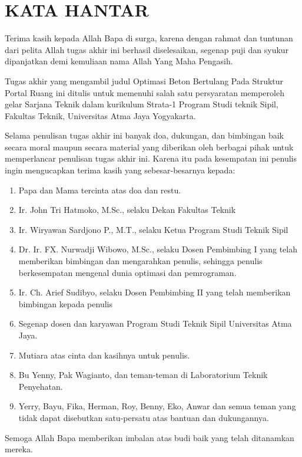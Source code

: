 \chapter*{KATA HANTAR}

Terima kasih kepada Allah Bapa di surga, karena dengan rahmat dan tuntunan
dari pelita Allah tugas akhir ini berhasil diselesaikan, segenap puji dan
syukur dipanjatkan demi kemuliaan nama Allah Yang Maha Pengasih.

Tugas akhir yang mengambil judul Optimasi Beton Bertulang Pada Struktur
Portal Ruang ini ditulis untuk memenuhi salah satu persyaratan memperoleh
gelar Sarjana Teknik dalam kurikulum Strata-1 Program Studi teknik Sipil,
Fakultas Teknik, Universitas Atma Jaya Yogyakarta.

Selama penulisan tugas akhir ini banyak doa, dukungan, dan bimbingan baik
secara moral maupun secara material yang diberikan oleh berbagai pihak
untuk memperlancar penulisan tugas akhir ini. Karena itu pada kesempatan
ini penulis ingin mengucapkan terima kasih yang sebesar-besarnya kepada:

\begin{enumerate}
\item Papa dan Mama tercinta atas doa dan restu.
\item Ir. John Tri Hatmoko, M.Sc., selaku Dekan Fakultas Teknik
\item Ir. Wiryawan Sardjono P., M.T., selaku Ketua Program Studi Teknik Sipil
\item Dr. Ir. FX. Nurwadji Wibowo, M.Sc., selaku Dosen Pembimbing I yang telah
      memberikan bimbingan dan mengarahkan penulis, sehingga penulis
      berkesempatan mengenal dunia optimasi dan pemrograman.
\item Ir. Ch. Arief Sudibyo, selaku Dosen Pembimbing II yang telah memberikan
      bimbingan kepada penulis
\item Segenap dosen dan karyawan Program Studi Teknik Sipil Universitas Atma
      Jaya.
\item Mutiara atas cinta dan kasihnya untuk penulis.
\item Bu Yenny, Pak Wagianto, dan teman-teman di Laboratorium Teknik
      Penyehatan.
\item Yerry, Bayu, Fika, Herman, Roy, Benny, Eko, Anwar dan semua teman yang
      tidak dapat disebutkan satu-persatu atas bantuan dan dukungannya.
\end{enumerate}

Semoga Allah Bapa memberikan imbalan atas budi baik yang telah ditanamkan
mereka.

\clearpage
